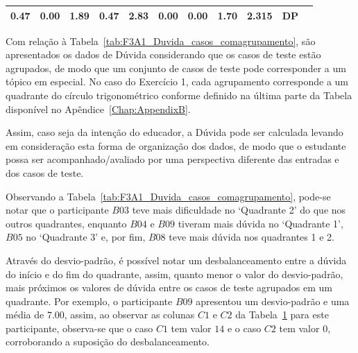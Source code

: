 \begin{table}[htbp]
\begin{tabular}{|ccccccccccc|}
		\multicolumn{1}{c|}{\cellcolor[HTML]{D9D9D9}0.47} &
		\multicolumn{1}{c|}{\cellcolor[HTML]{D9D9D9}0.00} &
		\multicolumn{1}{c|}{\cellcolor[HTML]{D9D9D9}1.89} &
		\multicolumn{1}{c|}{\cellcolor[HTML]{D9D9D9}0.47} &
		\multicolumn{1}{c|}{\cellcolor[HTML]{D9D9D9}2.83} &
		\multicolumn{1}{c|}{\cellcolor[HTML]{D9D9D9}0.00} &
		\multicolumn{1}{c|}{\cellcolor[HTML]{D9D9D9}0.00} &
		\multicolumn{1}{c|}{\cellcolor[HTML]{D9D9D9}1.70} &
		\multicolumn{1}{c|}{\cellcolor[HTML]{D9D9D9}2.315} &
		DP \\ \hline
	\end{tabular}
	\label{tab:F3A1_Duvida_casos_semagrupamento}
\end{table}

Com relação à Tabela~\ref{tab:F3A1_Duvida_casos_comagrupamento}, são apresentados os dados de Dúvida considerando que os casos de teste estão agrupados, de modo que um conjunto de casos de teste pode corresponder a um tópico em especial. No caso do Exercício 1, cada agrupamento corresponde a um quadrante do círculo trigonométrico conforme definido na última parte da Tabela disponível no Apêndice~\ref{Chap:AppendixB}. 

Assim, caso seja da intenção do educador, a Dúvida pode ser calculada levando em consideração esta forma de organização dos dados, de modo que o estudante possa ser acompanhado/avaliado por uma perspectiva diferente das entradas e dos casos de teste.

Observando a Tabela~\ref{tab:F3A1_Duvida_casos_comagrupamento}, pode-se notar que o participante $B03$ teve mais dificuldade no `Quadrante 2' do que nos outros quadrantes, enquanto $B04$ e $B09$ tiveram mais dúvida no `Quadrante 1', $B05$ no `Quadrante 3' e, por fim, $B08$ teve mais dúvida nos quadrantes 1 e 2.

Através do desvio-padrão, é possível notar um desbalanceamento entre a dúvida do início e do fim do quadrante, assim, quanto menor o valor do desvio-padrão, mais próximos os valores de dúvida entre os casos de teste agrupados em um quadrante. Por exemplo, o participante $B09$ apresentou um desvio-padrão e uma média de $7.00$, assim, ao observar as colunas $C1$ e $C2$ da Tabela~\ref{tab:F3A1_Duvida_casos_semagrupamento} para este participante, observa-se que o caso $C1$ tem valor $14$ e o caso $C2$ tem valor $0$, corroborando a suposição do desbalanceamento.

